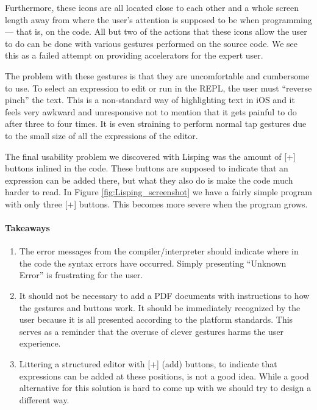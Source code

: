 Furthermore, these icons are all located close to each other and a whole screen length away from where the user's attention is supposed to be when programming --- that is, on the code. All but two of the actions that these icons allow the user to do can be done with various gestures performed on the source code. We see this as a failed attempt on providing accelerators for the expert user.

The problem with these gestures is that they are uncomfortable and cumbersome to use. To select an expression to edit or run in the REPL, the user must ``reverse pinch'' the text. This is a non-standard way of highlighting text in iOS and it feels very awkward and unresponsive not to mention that it gets painful to do after three to four times. It is even straining to perform normal tap gestures due to the small size of all the expressions of the editor.

The final usability problem we discovered with Lisping was the amount of [+] buttons inlined in the code. These buttons are supposed to indicate that an expression can be added there, but what they also do is make the code much harder to read.
In Figure \ref{fig:Lisping_screenshot} we have a fairly simple program with
only three [+] buttons. This becomes more severe when the program grows.

\paragraph{Takeaways}
\begin{enumerate}
	\item The error messages from the compiler/interpreter should indicate where in the code the syntax errors have occurred. Simply presenting “Unknown Error” is frustrating for the user.
	\item It should not be necessary to add a PDF documents with instructions to how the gestures and buttons work. It should be immediately recognized by the user because it is all presented according to the platform standards. This serves as a reminder that the overuse of clever gestures harms the user experience.
	\item Littering a structured editor with [+] (add) buttons, to indicate that expressions can be added at these positions, is not a good idea. While a good alternative for this solution is hard to come up with we should try to design a different way.
\end{enumerate}

